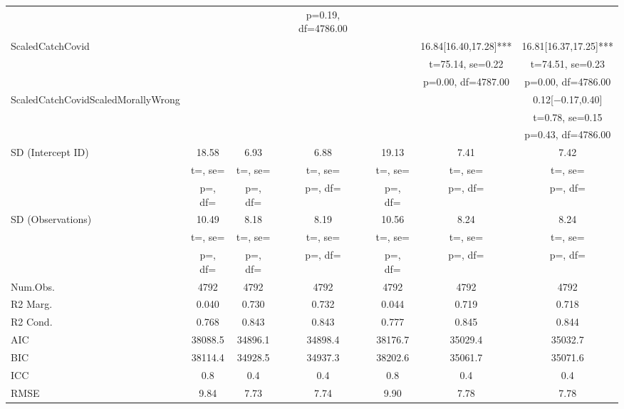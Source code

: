 \documentclass[]{report}
\begin{document}
\begin{table}
{\begin{tabular}[t]{lcccccc}
		&  &  & p=\num{0.19}, df=\num{4786.00} &  &  & \\
		ScaledCatchCovid &  &  &  &  & \num{16.84}[\num{16.40},\num{17.28}]*** & \num{16.81}[\num{16.37},\num{17.25}]***\\
		&  &  &  &  & t=\num{75.14}, se=\num{0.22} & t=\num{74.51}, se=\num{0.23}\\
		&  &  &  &  & p=\num{0.00}, df=\num{4787.00} & p=\num{0.00}, df=\num{4786.00}\\
		ScaledCatchCovidScaledMorallyWrong &  &  &  &  &  & \num{0.12}[\num{-0.17},\num{0.40}]\\
		&  &  &  &  &  & t=\num{0.78}, se=\num{0.15}\\
		&  &  &  &  &  & p=\num{0.43}, df=\num{4786.00}\\
		SD (Intercept ID) & \num{18.58} & \num{6.93} & \num{6.88} & \num{19.13} & \num{7.41} & \num{7.42}\\
		& t=, se= & t=, se= & t=, se= & t=, se= & t=, se= & t=, \vphantom{1} se=\\
		& p=, df= & p=, df= & p=, df= & p=, df= & p=, df= & p=, \vphantom{1} df=\\
		SD (Observations) & \num{10.49} & \num{8.18} & \num{8.19} & \num{10.56} & \num{8.24} & \num{8.24}\\
		& t=, se= & t=, se= & t=, se= & t=, se= & t=, se= & t=, se=\\
		& p=, df= & p=, df= & p=, df= & p=, df= & p=, df= & p=, df=\\
		\midrule
		Num.Obs. & \num{4792} & \num{4792} & \num{4792} & \num{4792} & \num{4792} & \num{4792}\\
		R2 Marg. & \num{0.040} & \num{0.730} & \num{0.732} & \num{0.044} & \num{0.719} & \num{0.718}\\
		R2 Cond. & \num{0.768} & \num{0.843} & \num{0.843} & \num{0.777} & \num{0.845} & \num{0.844}\\
		AIC & \num{38088.5} & \num{34896.1} & \num{34898.4} & \num{38176.7} & \num{35029.4} & \num{35032.7}\\
		BIC & \num{38114.4} & \num{34928.5} & \num{34937.3} & \num{38202.6} & \num{35061.7} & \num{35071.6}\\
		ICC & \num{0.8} & \num{0.4} & \num{0.4} & \num{0.8} & \num{0.4} & \num{0.4}\\
		RMSE & \num{9.84} & \num{7.73} & \num{7.74} & \num{9.90} & \num{7.78} & \num{7.78}\\
		\bottomrule
	\end{tabular}}
\end{table}
\end{document}

